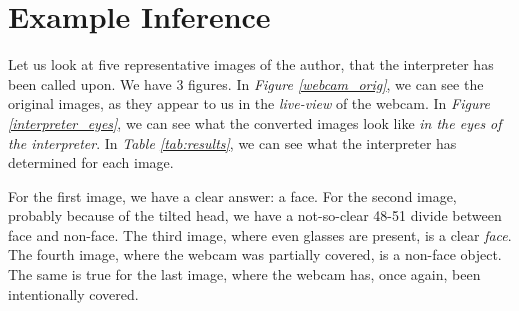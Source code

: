 \newpage
\section{Example Inference}
Let us look at five representative images of the author, that the interpreter has been called upon. We have 3 figures. In \textit{Figure \ref{webcam_orig}}, we can see the original images, as they appear to us in the \textit{live-view} of the webcam. In \textit{Figure \ref{interpreter_eyes}}, we can see what the converted images look like \textit{in the eyes of the interpreter}. In \textit{Table \ref{tab:results}}, we can see what the interpreter has determined for each image. \par
For the first image, we have a clear answer: a face. For the second image, probably because of the tilted head, we have a not-so-clear 48-51 divide between face and non-face. The third image, where even glasses are present, is a clear \textit{face}. The fourth image, where the webcam was partially covered, is a non-face object. The same is true for the last image, where the webcam has, once again, been intentionally covered.

